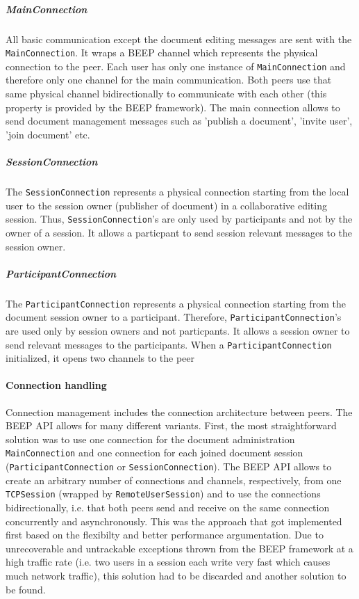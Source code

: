 \subparagraph{MainConnection}
All basic communication except the document editing messages are sent with the \texttt{MainConnection}. It wraps a BEEP channel which represents the physical connection to the peer. Each user has only one instance of \texttt{MainConnection} and therefore only one channel for the main communication. Both peers use that same physical channel bidirectionally to communicate with each other (this property is provided by the BEEP framework). The main connection allows to send document management messages such as 'publish a document', 'invite user', 'join document' etc.

\subparagraph{SessionConnection}
The \texttt{SessionConnection} represents a physical connection starting from the local user to the session owner (publisher of document) in a collaborative editing session. Thus, \texttt{SessionConnection}'s are only used by participants and not by the owner of a session. It allows a particpant to send session relevant messages to the session owner.

\subparagraph{ParticipantConnection}
The \texttt{ParticipantConnection} represents a physical connection starting from the document session owner to a participant. Therefore, \texttt{ParticipantConnection}'s are used only by session owners and not particpants. It allows a session owner to send relevant messages to the participants. When a \texttt{ParticipantConnection} initialized, it opens two channels to the peer


\paragraph{Connection handling}
Connection management includes the connection architecture between peers. The BEEP API allows for many different variants. First, the most straightforward solution was to use one connection for the document administration \texttt{MainConnection} and one connection for each joined document session (\texttt{ParticipantConnection} or \texttt{SessionConnection}). The BEEP API allows to create an arbitrary number of connections and channels, respectively, from one \texttt{TCPSession} (wrapped by \texttt{RemoteUserSession}) and to use the connections bidirectionally, i.e. that both peers send and receive on the same connection concurrently and asynchronously. This was the approach that got implemented first based on the flexibilty and better performance argumentation. Due to unrecoverable and untrackable exceptions thrown from the BEEP framework at a high traffic rate (i.e. two users in a session each write very fast which causes much network traffic), this solution had to be discarded and another solution to be found. 

